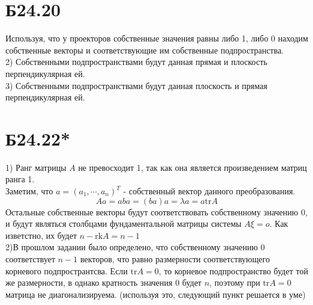 \documentclass[a4paper,12pt]{article} %
\begin{document}
\section*{Б24.20}Используя, что у проекторов собственные значения равны либо 1, либо 0 находим собственные векторы и соответствующие им собственные подпространства.\\
2) Собственными подпространствами будут данная прямая и плоскость перпендикулярная ей.\\
3) Собственными подпространствами будут данная плоскость и прямая перпендикулярная ей.
\section*{Б24.22*}
1) Ранг матрицы $A$ не превосходит 1, так как она является произведением  матриц ранга 1. \\
Заметим, что $a=(a_1,\cdots,a_n)^{T}$ - собственный вектор данного преобразования.
$$Aa=aba=(ba)a=\lambda a=a\mathrm{tr}A$$
Остальные собственные векторы будут соответствовать собственному значению 0, и будут являться столбцами фундаментальной матрицы системы $A\xi=o$. Как изветстно, их будет $n-\mathrm{rk}A=n-1$\\
2)В прошлом задании было определено, что собственному значению 0 соответствует $n-1$ векторов, что равно размерности соответствующего корневого подпространтсва. Если $\mathrm{tr}A=0$, то корневое подпространство будет той же размерности, в однако кратность значения 0 будет $n$, поэтому при $\mathrm{tr}A=0$ матрица не диагонализируема. (используя это, следующий пункт решается в уме)
\end{document}
